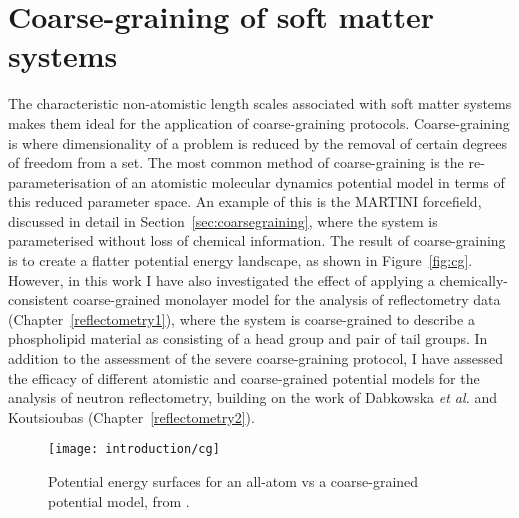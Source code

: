 \section{Coarse-graining of soft matter systems}

The characteristic non-atomistic length scales associated with soft matter systems makes them ideal for the application of coarse-graining protocols.
Coarse-graining is where dimensionality of a problem is reduced by the removal of certain degrees of freedom from a set.
The most common method of coarse-graining is the re-parameterisation of an atomistic molecular dynamics potential model in terms of this reduced parameter space.
An example of this is the MARTINI forcefield, discussed in detail in Section~\ref{sec:coarsegraining}, where the system is parameterised without loss of chemical information.
The result of coarse-graining is to create a flatter potential energy landscape, as shown in Figure~\ref{fig:cg}.
However, in this work I have also investigated the effect of applying a chemically-consistent coarse-grained monolayer model for the analysis of reflectometry data (Chapter~\ref{reflectometry1}), where the system is coarse-grained to describe a phospholipid material as consisting of a head group and pair of tail groups.
In addition to the assessment of the severe coarse-graining protocol, I have assessed the efficacy of different atomistic and coarse-grained potential models for the analysis of neutron reflectometry, building on the work of Dabkowska \emph{et al.} and Koutsioubas \cite{koutsioubas_combined_2016} (Chapter~\ref{reflectometry2}).
%
\begin{figure}
    \centering
    \texttt{[image: introduction/cg]}
    \caption{Potential energy surfaces for an all-atom vs a coarse-grained potential model, from \cite{kmiecik_coarse-grained_2016}.}
    \label{fig:pack}
\end{figure}
%
